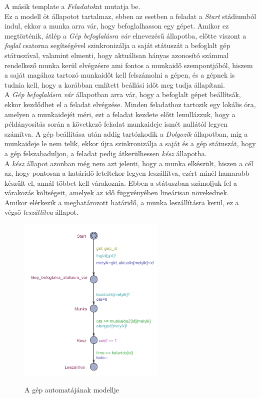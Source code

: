 \documentclass {report}
\begin{document}
    A másik template a \emph{Feladatok}at mutatja be.\\
    Ez a modell öt állapotot tartalmaz, ebben az esetben a feladat a \emph{Start} stádiumból indul, ekkor a munka arra vár, hogy befoglalhasson egy gépet. Amikor ez megtörténik, átlép a \emph{Gép befoglalásra vár} elnevezésű állapotba, előtte viszont a \emph{foglal} csatorna segítségével szinkronizálja a saját státuszát a befoglalt gép státuszával, valamint elmenti, hogy aktuálisan hányas azonosító számmal rendelkező munka kerül elvégzésre ami fontos a munkaidő szempontjából, hiszem a saját magához tartozó munkaidőt kell felszámolni a gépen, és a gépnek is tudnia kell, hogy a korábban említett beállási időt meg tudja állapítani. \\
    A \emph{Gép befoglalásra vár} állapotban arra vár, hogy a befoglalt gépet beállítsák, ekkor kezdődhet el a feladat elvégzése. Minden feladathoz tartozik egy lokális óra, amelyen a munkaidejét méri, ezt a feladat kezdete előtt lenullázzuk, hogy a példányosítás során a következő feladat munkaideje ismét nullától legyen számítva. A gép beállítása után addig tartózkodik a \emph{Dolgozik} állapotban, míg a munkaideje le nem telik, ekkor újra szinkronizálja a saját és a gép státuszát, hogy a gép felszabaduljon, a feladat pedig átkerülhessen \emph{kész} állapotba. \\
    A \emph{kész} állapot azonban még nem azt jelenti, hogy a munka elkészült, hiszen a cél az, hogy pontosan a határidő leteltekor legyen leszállítva, ezért minél hamarabb készült el, annál többet kell várakoznia. Ebben a státuszban számoljuk fel a várakozás költségeit, amelyek az idő függvényében lineárisan növekednek. \\
    Amikor elérkezik a meghatározott határidő, a munka leszállításra kerül, ez a végső \emph{leszállítva} állapot.  
    \begin{figure}[htpb]
        \begin{center}
       \includegraphics[height=8cm]{Feladat}\\
        \caption{A gép automatájának modellje}
        \end{center}
        \end{figure}
\end{document}
